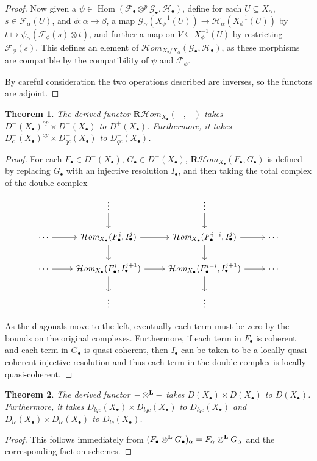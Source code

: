\documentclass[proquest]{uwthesis}[2014/11/13]
\newtheorem{theorem}{Theorem}[section]
\theoremstyle{definition}
\DeclareMathOperator{\Hom}{Hom}
\newcommand{\cHom}{\mathcal{H} \textit{om}}
\newcommand{\FF}{\mathscr{F}}
\newcommand{\GG}{\mathscr{G}}
\newcommand{\cH}{\mathscr{H}}
\newcommand{\bR}{\textbf{R}}
\newcommand{\otimesL}{\otimes^{\bf L}}
\begin{document}
\begin{proof}
	Now given a $\psi \in \Hom(\FF_\bullet \otimes^p \GG_\bullet, \cH_\bullet)$, define for each $U \subseteq X_\alpha$, $s \in \FF_\alpha(U)$, and $\phi : \alpha \rightarrow \beta$, a map $\GG_\alpha(X_\phi^{-1}(U)) \rightarrow \cH_\alpha(X_\phi^{-1}(U))$ by $t \mapsto \psi_\alpha(\FF_\phi(s) \otimes t)$, and further a map on $V \subseteq X_\phi^{-1}(U)$ by restricting $\FF_\phi(s)$.
	This defines an element of $\cHom_{X_\bullet / X_\alpha}(\GG_\bullet, \cH_\bullet)$, as these morphisms are compatible by the compatibility of $\psi$ and $\FF_\phi$.
	
	By careful consideration the two operations described are inverses, so the functors are adjoint.
\end{proof}

\begin{theorem}
	The derived functor $\bR \cHom_{X_\bullet}(-,-)$ takes $D^-(X_\bullet)^{op} \times D^+(X_\bullet)$ to $D^+(X_\bullet)$.
	Furthermore, it takes $D^-_c(X_\bullet)^{op} \times D^+_{qc}(X_\bullet)$ to $D^+_{qc}(X_\bullet)$.
\end{theorem}
\begin{proof}
	For each $F_\bullet \in D^-(X_\bullet)$, $G_\bullet \in D^+(X_\bullet)$, $\bR \cHom_{X_\bullet}(F_\bullet, G_\bullet)$ is defined by replacing $G_\bullet$ with an injective resolution $I_\bullet$, and then taking the total complex of the double complex
	\[
	\begin{tikzcd}
				{}&	\vdots \arrow{d}	&	\vdots \arrow{d} & \\
		\cdots	\arrow{r}	&	\cHom_{X_\bullet}(F^i_\bullet, I^j_\bullet) \arrow{r} \arrow{d}	&	\cHom_{X_\bullet}(F^{i-i}_\bullet, I^j_\bullet) \arrow{d} \arrow{r}	& \cdots \\
		\cdots	\arrow{r}	&	\cHom_{X_\bullet}(F^i_\bullet, I^{j+1}_\bullet) \arrow{r} \arrow{d}	&	\cHom_{X_\bullet}(F^{i-i}_\bullet, I^{j+1}_\bullet) \arrow{d} \arrow{r}	& \cdots \\
				&	\vdots	&	\vdots &
	\end{tikzcd}
	\]
	
	As the diagonals move to the left, eventually each term must be zero by the bounds on the original complexes.
	Furthermore, if each term in $F_\bullet$ is coherent and each term in $G_\bullet$ is quasi-coherent, then $I_\bullet$ can be taken to be a locally quasi-coherent injective resolution and thus each term in the double complex is locally quasi-coherent.
\end{proof}

\begin{theorem}
	The derived functor $-\otimesL-$ takes $D(X_\bullet) \times D(X_\bullet)$ to $D(X_\bullet)$.
	Furthermore, it takes $D_{lqc}(X_\bullet) \times D_{lqc}(X_\bullet)$ to $D_{lqc}(X_\bullet)$ and $D_{lc}(X_\bullet) \times D_{lc}(X_\bullet)$ to $D_{lc}(X_\bullet)$.
\end{theorem}
\begin{proof}
	This follows immediately from $(F_\bullet \otimesL G_\bullet)_\alpha = F_\alpha \otimesL G_\alpha$ and the corresponding fact on schemes.
\end{proof}
\end{document}
